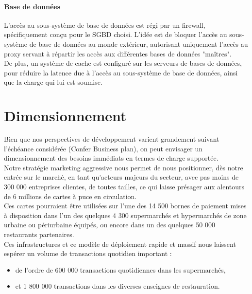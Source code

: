 \paragraph{Base de données}

L'accès au sous-système de base de données est régi par un firewall,
spécifiquement conçu pour le SGBD choisi. L'idée est de bloquer l'accès au
sous-système de base de données au monde extérieur, autorisant uniquement
l'accès au proxy servant à répartir les accès aux différentes bases de données
"maîtres". \\

De plus, un système de cache est configuré sur les serveurs de bases de données,
pour réduire la latence due à l'accès au sous-système de base de données, ainsi que
la charge qui lui est soumise.

\section{Dimensionnement}
\label{sec:Dimensionnement}

Bien que nos perspectives de développement varient grandement suivant l'échéance
considérée (Confer Business plan), on peut envisager un dimensionnement
des besoins immédiats en termes de charge supportée. \\

Notre stratégie marketing aggressive nous permet de nous positionner, dès notre
entrée sur le marché, en tant qu'acteurs majeurs du secteur, avec pas moins de
300 000 entreprises clientes, de toutes tailles, ce qui laisse présager aux
alentours de 6 millions de cartes à puce en circulation. \\

Ces cartes pourraient être utilisées sur l'une des 14 500 bornes de paiement mises
à disposition dans l'un des quelques 4 300 supermarchés et hypermarchés de zone
urbaine ou périurbaine équipés, ou encore dans un des quelques 50 000 restaurants
partenaires. \\

Ces infrastructures et ce modèle de déploiement rapide et massif nous laissent
espérer un volume de transactions quotidien important :

\begin{itemize}
    \item de l'ordre de 600 000 transactions quotidiennes dans les supermarchés,
    \item et 1 800 000 transactions dans les diverses enseignes de restauration.
\end{itemize}

